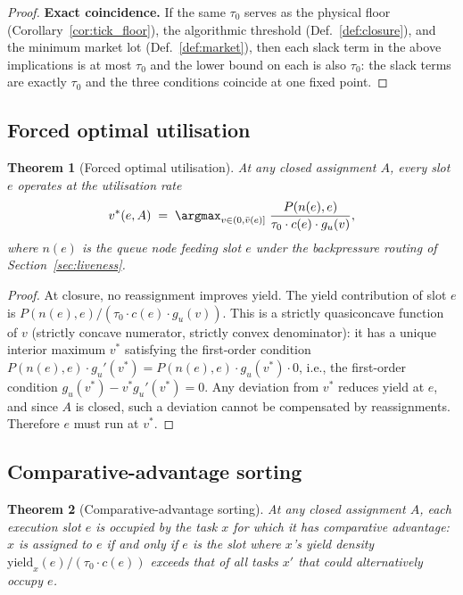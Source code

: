 \documentclass[11pt,twocolumn,a4paper]{article}
\theoremstyle{plain}
\newtheorem{theorem}{Theorem}[section]
\theoremstyle{definition}
\theoremstyle{remark}
\newcommand{\tick}{\tau_0}
\newcommand{\yield}{\mathrm{yield}}
\newcommand{\pres}{P}
\begin{document}
\begin{proof}
\medskip
\noindent\textbf{Exact coincidence.} If the same $\tick$ serves as the physical floor (Corollary~\ref{cor:tick_floor}), the algorithmic threshold (Def.~\ref{def:closure}), and the minimum market lot (Def.~\ref{def:market}), then each slack term in the above implications is at most $\tick$ and the lower bound on each is also $\tick$: the slack terms are exactly $\tick$ and the three conditions coincide at one fixed point.
\end{proof}

\subsection{Forced optimal utilisation}

\begin{theorem}[Forced optimal utilisation]
\label{thm:forcedutil}
At any closed assignment $A$, every slot $e$ operates at the utilisation rate
\[
  v^*(e, A) \;=\; \argmax_{v \in (0,\bar{v}(e)]} \;\frac{\pres(n(e), e)}{\tick \cdot c(e) \cdot g_u(v)},
\]
where $n(e)$ is the queue node feeding slot $e$ under the backpressure routing of Section~\ref{sec:liveness}.
\end{theorem}

\begin{proof}
At closure, no reassignment improves yield. The yield contribution of slot $e$ is $\pres(n(e), e) / (\tick \cdot c(e) \cdot g_u(v))$. This is a strictly quasiconcave function of $v$ (strictly concave numerator, strictly convex denominator): it has a unique interior maximum $v^*$ satisfying the first-order condition $\pres(n(e), e) \cdot g_u'(v^*) = \pres(n(e), e) \cdot g_u(v^*) \cdot 0$, i.e., the first-order condition $g_u(v^*) - v^* g_u'(v^*) = 0$. Any deviation from $v^*$ reduces yield at $e$, and since $A$ is closed, such a deviation cannot be compensated by reassignments. Therefore $e$ must run at $v^*$.
\end{proof}

\subsection{Comparative-advantage sorting}

\begin{theorem}[Comparative-advantage sorting]
\label{thm:sorting}
At any closed assignment $A$, each execution slot $e$ is occupied by the task $x$ for which it has comparative advantage: $x$ is assigned to $e$ if and only if $e$ is the slot where $x$'s yield density $\yield_x(e)/(\tick \cdot c(e))$ exceeds that of all tasks $x'$ that could alternatively occupy $e$.
\end{theorem}
\end{document}
